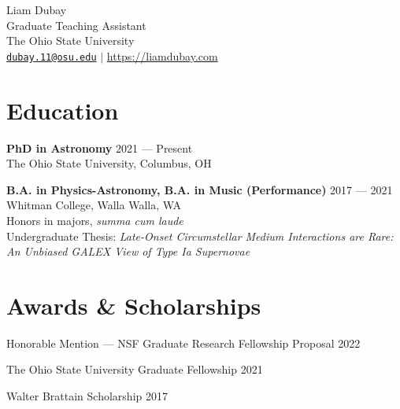 \documentclass[12pt]{article}
\begin{document}
\begin{center}
    {\huge Liam Dubay} \\
    \vspace{8pt}
    {\Large Graduate Teaching Assistant\\The Ohio State University} \\
    \vspace{6pt}
    {\large \href{mailto:dubay.11@osu.edu}{\texttt{dubay.11@osu.edu}} $\vert$ \url{https://liamdubay.com}}

\end{center}

\section*{Education}

\textbf{PhD in Astronomy}
\hfill 2021 --- Present \\
The Ohio State University, Columbus, OH
\vspace{12pt}

\textbf{B.A. in Physics-Astronomy, B.A. in Music (Performance)} 
\hfill 2017 --- 2021 \\
Whitman College, Walla Walla, WA \\
Honors in majors, \textit{summa cum laude} \\
Undergraduate Thesis: \textit{Late-Onset Circumstellar Medium Interactions are Rare: An Unbiased GALEX View of Type Ia Supernovae}

\section*{Awards \& Scholarships}

Honorable Mention --- NSF Graduate Research Fellowship Proposal \hfill 2022

The Ohio State University Graduate Fellowship \hfill 2021

Walter Brattain Scholarship \hfill 2017

\end{document}
